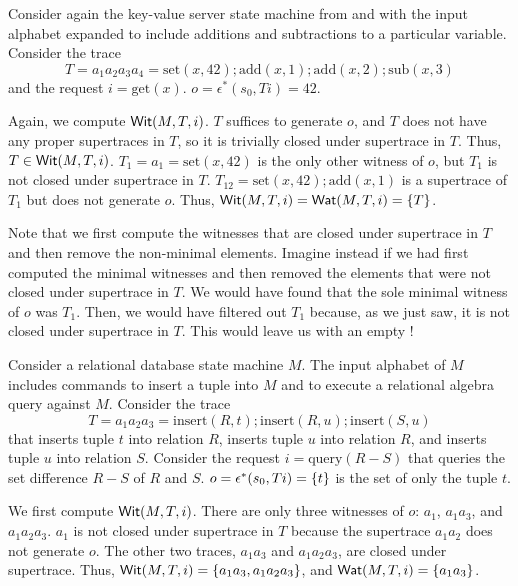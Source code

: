 \begin{example}
  \newcommand{\Mget}{\text{get}}
  \newcommand{\Mset}{\text{set}}
  \newcommand{\Madd}{\text{add}}
  \newcommand{\Msub}{\text{sub}}
  Consider again the key-value server state machine from
   and  with the input
  alphabet expanded to include additions and subtractions to a particular
  variable. Consider the trace
  \[
    T = a_1 a_2 a_3 a_4 = \Mset(x, 42); \Madd(x, 1); \Madd(x, 2); \Msub(x, 3)
  \]
  and the request $i = \Mget(x)$. $o = \epsilon^*(s_0, Ti) = 42$.

  Again, we compute $\textsf{Wit}(M, T, i)$. $T$ suffices to generate $o$, and $T$
  does not have any proper supertraces in $T$, so it is trivially closed under
  supertrace in $T$. Thus, $T \in \textsf{Wit}(M, T, i)$.
  $T_1 = a_1 = \Mset(x, 42)$ is the only other witness of $o$, but $T_1$ is not
  closed under supertrace in $T$. $T_{12} = \Mset(x, 42); \Madd(x, 1)$ is a
  supertrace of $T_1$ but does not generate $o$.
  Thus, $\textsf{Wit}(M, T, i) = \textsf{Wat}(M, T, i) = \{T\}$.

  Note that we first compute the witnesses that are closed under supertrace in
  $T$ and then remove the non-minimal elements. Imagine instead if we had first
  computed the minimal witnesses and then removed the elements that were not
  closed under supertrace in $T$. We would have found that the sole minimal
  witness of $o$ was $T_1$. Then, we would have filtered out $T_1$ because, as
  we just saw, it is not closed under supertrace in $T$. This would leave us
  with an empty \watprovenance{}!
\end{example}

\begin{example}
  \newcommand{\Mins}{\text{insert}}
  \newcommand{\Mquery}{\text{query}}
  Consider a relational database state machine $M$. The input alphabet of $M$
  includes commands to insert a tuple into $M$ and to execute a relational
  algebra query against $M$. Consider the trace
  \[
    T = a_1 a_2 a_3 = \Mins(R, t); \Mins(R, u); \Mins(S, u)
  \]
  that inserts tuple $t$ into relation $R$, inserts tuple $u$ into relation
  $R$, and inserts tuple $u$ into relation $S$. Consider the request $i =
  \Mquery(R - S)$ that queries the set difference $R - S$ of $R$ and $S$. $o =
  \epsilon^*(s_0, Ti) = \{t\}$ is the set of only the tuple $t$.

  We first compute $\textsf{Wit}(M, T, i)$. There are only three witnesses of $o$:
  $a_1$, $a_1a_3$, and $a_1a_2a_3$.  $a_1$ is not closed under supertrace in
  $T$ because the supertrace $a_1a_2$ does not generate $o$. The other two
  traces, $a_1a_3$ and $a_1a_2a_3$, are closed under supertrace. Thus, $\textsf{Wit}(M,
  T, i) = \{a_1a_3, a_1a_2a_3\}$, and $\textsf{Wat}(M, T, i) = \{a_1a_3\}$.
\end{example}

